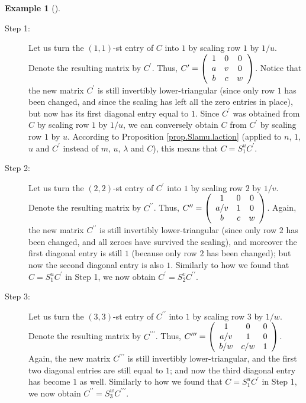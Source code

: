 \documentclass[numbers=enddot,12pt,final,onecolumn,notitlepage]{scrartcl}%
\theoremstyle{definition}
\newtheorem{exam}[theo]{Example}
\newenvironment{example}[1][]
{\begin{exam}[#1]\begin{leftbar}}
{\end{leftbar}\end{exam}}
\begin{document}
\begin{example}
\begin{description}
\item[Step 1:] Let us turn the $\left(  1,1\right)  $-st entry of $C$ into $1$
by scaling row $1$ by $1/u$. Denote the resulting matrix by $C^{\prime}$.
Thus, $C^{\prime}=\left(
\begin{array}
[c]{ccc}%
1 & 0 & 0\\
a & v & 0\\
b & c & w
\end{array}
\right)  $. Notice that the new matrix $C^{\prime}$ is still invertibly
lower-triangular (since only row $1$ has been changed, and since the scaling
has left all the zero entries in place), but now has its first diagonal entry
equal to $1$. Since $C^{\prime}$ was obtained from $C$ by scaling row $1$ by
$1/u$, we can conversely obtain $C$ from $C^{\prime}$ by scaling row $1$ by
$u$. According to Proposition \ref{prop.Slamu.laction} (applied to $n$, $1$,
$u$ and $C^{\prime}$ instead of $m$, $u$, $\lambda$ and $C$), this means that
$C=S_{1}^{u}C^{\prime}$.

\item[Step 2:] Let us turn the $\left(  2,2\right)  $-st entry of $C^{\prime}$
into $1$ by scaling row $2$ by $1/v$. Denote the resulting matrix by
$C^{\prime\prime}$. Thus, $C^{\prime\prime}=\left(
\begin{array}
[c]{ccc}%
1 & 0 & 0\\
a/v & 1 & 0\\
b & c & w
\end{array}
\right)  $. Again, the new matrix $C^{\prime\prime}$ is still invertibly
lower-triangular (since only row $2$ has been changed, and all zeroes have
survived the scaling), and moreover the first diagonal entry is still $1$
(because only row $2$ has been changed); but now the second diagonal entry is
also $1$. Similarly to how we found that $C=S_{1}^{u}C^{\prime}$ in Step 1, we
now obtain $C^{\prime}=S_{2}^{v}C^{\prime\prime}$.

\item[Step 3:] Let us turn the $\left(  3,3\right)  $-st entry of
$C^{\prime\prime}$ into $1$ by scaling row $3$ by $1/w$. Denote the resulting
matrix by $C^{\prime\prime\prime}$. Thus, $C^{\prime\prime\prime}=\left(
\begin{array}
[c]{ccc}%
1 & 0 & 0\\
a/v & 1 & 0\\
b/w & c/w & 1
\end{array}
\right)  $. Again, the new matrix $C^{\prime\prime\prime}$ is still invertibly
lower-triangular, and the first two diagonal entries are still equal to $1$;
and now the third diagonal entry has become $1$ as well. Similarly to how we
found that $C=S_{1}^{u}C^{\prime}$ in Step 1, we now obtain $C^{\prime\prime
}=S_{3}^{w}C^{\prime\prime\prime}$.
\end{description}


\end{example}
\end{document}

